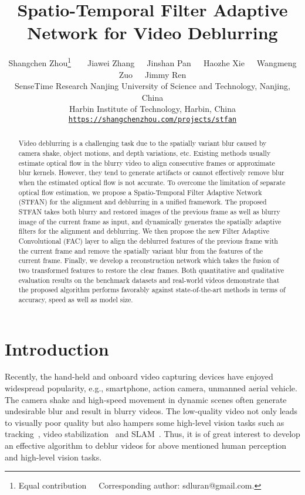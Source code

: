 \documentclass[10pt,twocolumn,letterpaper]{article}
\begin{document}
\title{Spatio-Temporal Filter Adaptive Network for Video Deblurring}
\author{Shangchen Zhou\thanks{Equal contribution\ \ \ Corresponding author: sdluran@gmail.com.}\ \ \ \ Jiawei Zhang\ \ \ Jinshan Pan\ \ \ Haozhe Xie\ \ \ Wangmeng Zuo\ \ \ Jimmy Ren\\
SenseTime Research\quad
Nanjing University of Science and Technology, Nanjing, China\\
Harbin Institute of Technology, Harbin, China\\
{\tt\small \url{https://shangchenzhou.com/projects/stfan}}
}
\maketitle
\thispagestyle{empty}
\begin{abstract}
Video deblurring is a challenging task due to the spatially variant blur caused by camera shake, object motions, and depth variations, etc. 
Existing methods usually estimate optical flow in the blurry video to align consecutive frames or approximate blur kernels.
However, they tend to generate artifacts or cannot effectively remove blur when the estimated optical flow is not accurate.
To overcome the limitation of separate optical flow estimation, we propose a Spatio-Temporal Filter Adaptive Network (STFAN) for the alignment and deblurring in a unified framework.
The proposed STFAN takes both blurry and restored images of the previous frame as well as blurry image of the current frame as input, 
and dynamically generates the spatially adaptive filters for the alignment and deblurring. 
We then propose the new Filter Adaptive Convolutional (FAC) layer to align the deblurred features of the previous frame with the current frame and remove the spatially variant blur from the features of the current frame.
Finally, we develop a reconstruction network which takes the fusion of two transformed features to restore the clear frames.
Both quantitative and qualitative evaluation results on the benchmark datasets and real-world videos demonstrate that the proposed algorithm performs
favorably against state-of-the-art methods in terms of accuracy, speed as well as model size.
\end{abstract}
\vspace{-4mm}
\section{Introduction}
Recently, the hand-held and onboard video capturing devices have enjoyed widespread popularity, e.g., smartphone, action camera, unmanned aerial vehicle.
The camera shake and high-speed movement in dynamic scenes often generate undesirable blur and result in blurry videos.
The low-quality video not only leads to visually poor quality but also hampers some high-level vision tasks such as tracking~\cite{jin2005visual, mei2008modeling}, video stabilization~\cite{matsushita2006full} and SLAM~\cite{lee2011simultaneous}.
Thus, it is of great interest to develop an effective algorithm to deblur videos for above mentioned human perception and high-level vision tasks. 
\end{document}
